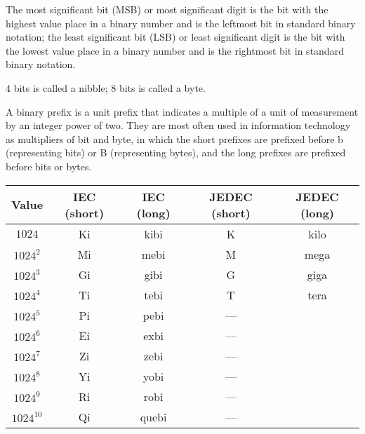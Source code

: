 \documentclass[a4paper,12pt]{report}
\begin{document}
The most significant bit (MSB) or most significant digit is the bit with the highest value place in a binary number and is the leftmost bit in standard binary notation; the least significant bit (LSB) or least significant digit is the bit with the lowest value place in a binary number and is the rightmost bit in standard binary notation.

$4$ bits is called a nibble; $8$ bits is called a byte.

A binary prefix is a unit prefix that indicates a multiple of a unit of measurement by an integer power of two. They are most often used in information technology as multipliers of bit and byte, in which the short prefixes are prefixed before b (representing bits) or B (representing bytes), and the long prefixes are prefixed before bits or bytes.
\begin{longtable}[c]{|c|c|c|c|c|}
\hline
Value & IEC (short) & IEC (long) & JEDEC (short) & JEDEC (long)\\\hline
$1024$ & Ki & kibi & K & kilo\\\hline
$1024^2$ & Mi & mebi & M & mega\\\hline
$1024^3$ & Gi & gibi & G & giga\\\hline
$1024^4$ & Ti & tebi & T & tera\\\hline
$1024^5$ & Pi & pebi & —\\\hline
$1024^6$ & Ei & exbi & —\\\hline
$1024^7$ & Zi & zebi & —\\\hline
$1024^8$ & Yi & yobi & —\\\hline
$1024^9$ & Ri & robi & —\\\hline
$1024^10$ & Qi & quebi & —\\\hline
\end{longtable}\FB
\end{document}
